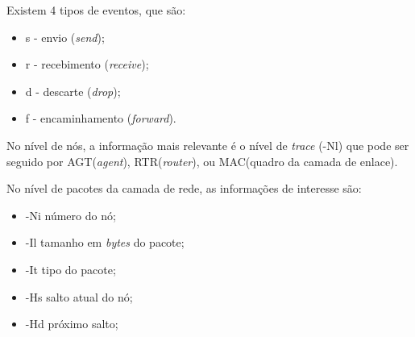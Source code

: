 Existem 4 tipos de eventos, que s\~ao:
\begin{itemize}
	\item s - envio (\textit{send});
	\item r - recebimento (\textit{receive});
	\item d - descarte (\textit{drop});
	\item f - encaminhamento (\textit{forward}).
\end{itemize}

No n\'ivel de n\'os, a informa\c{c}\~ao mais relevante \'e o n\'ivel de \textit{trace} (-Nl) que pode ser seguido por AGT(\textit{agent}), RTR(\textit{router}), ou MAC(quadro da camada de enlace).

No n\'ivel de pacotes da camada de rede, as informa\c{c}\~oes de interesse s\~ao:
\begin{itemize}
	\item -Ni n\'umero do n\'o;
	\item -Il tamanho em \textit{bytes} do pacote;
	\item -It tipo do pacote;
	\item -Hs salto atual do n\'o;
	\item -Hd pr\'oximo salto;
\end{itemize}
